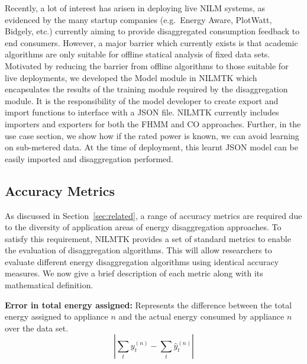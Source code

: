 \documentclass{sig-alternate}
\newcommand{\redcolor}[1]{\textcolor{red}{#1}}
\newcommand{\secref}[1]{Section~\ref{#1}}
\begin{document}

\noindent
Recently, a lot of interest has arisen in deploying live NILM systems, as evidenced by the many startup companies (e.g.\ Energy Aware, PlotWatt, Bidgely, etc.) currently aiming to provide disaggregated consumption feedback to end consumers. However, a major barrier which currently exists is that academic algorithms are only suitable for offline statical analysis of fixed data sets. Motivated by reducing the barrier from offline algorithms to those suitable for live deployments, we developed the Model module in NILMTK which encapsulates the results of the training module required by the disaggregation module. It is the responsibility of the model developer to create export and import functions to interface with a JSON file. NILMTK currently includes importers and exporters for both the FHMM and CO approaches. Further, in the use case section, we show how if the rated power is known, we can avoid learning on sub-metered data. At the time of deployment, this learnt JSON model can be easily imported and disaggregation performed.

\subsection{Accuracy Metrics}

\noindent
As discussed in \secref{sec:related}, a range of accuracy metrics are required due to the diversity of application areas of energy disaggregation approaches. To satisfy this requirement, NILMTK provides a set of standard metrics to enable the evaluation of disaggregation algorithms. This will allow researchers to evaluate different energy disaggregation algorithms using identical accuracy measures. We now give a brief description of each metric along with its mathematical definition.

\textbf{Error in total energy assigned:} Represents the difference between the total energy assigned to appliance $n$ and the actual energy consumed by appliance $n$ over the data set.
\begin{equation}
        \left | \sum_t y^{(n)}_t - \sum_t \hat{y}^{(n)}_t \right |
\end{equation}
\end{document}
